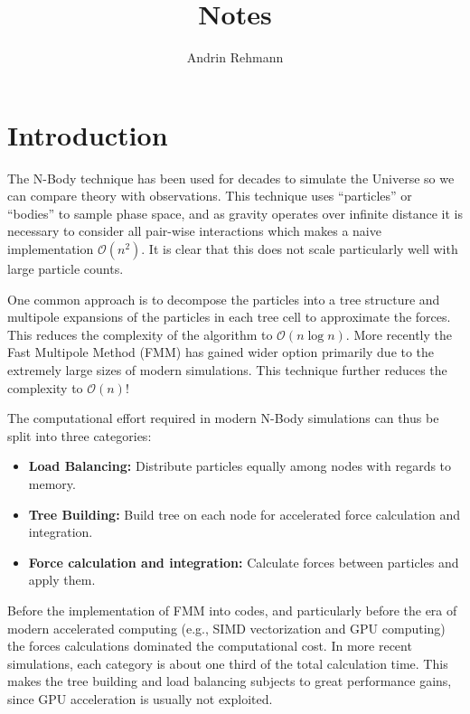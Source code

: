 \documentclass[]{article}
\title{Notes}
\author{Andrin Rehmann}
\begin{document}
\maketitle

\section{Introduction}


The N-Body technique has been used for decades to simulate the Universe so we can compare theory with observations. This technique uses ``particles'' or ``bodies'' to sample phase space, and as gravity operates over infinite distance it is necessary to consider all pair-wise interactions which makes a naive implementation $\mathcal{O}(n^2)$.
It is clear that this does not scale particularly well with large particle counts.

One common approach is to decompose the particles into a tree structure and multipole expansions of the particles in each tree cell to approximate the forces. This reduces the complexity of the algorithm to $\mathcal{O}(n\log{}n)$. More recently the Fast Multipole Method (FMM) has gained wider option primarily due to the extremely large sizes of modern simulations. This technique further reduces the complexity to $\mathcal{O}(n)$!

The computational effort required in modern N-Body simulations can thus be split into three categories:

\begin{itemize}
	\item \textbf{Load Balancing:} Distribute particles equally among nodes with regards to memory.
	\item \textbf{Tree Building:} Build tree on each node for accelerated force calculation and integration.
	\item \textbf{Force calculation and integration:} Calculate forces between particles and apply them.
\end{itemize}

Before the implementation of FMM into codes, and particularly before the era of modern accelerated computing (e.g., SIMD vectorization and GPU computing) the forces calculations dominated the computational cost. In more recent simulations, each category is about one third of the total calculation time\cite{2017ComAC...4....2P}. This makes the tree building and load balancing subjects to great performance gains, since GPU acceleration is usually not exploited. 
\end{document}
